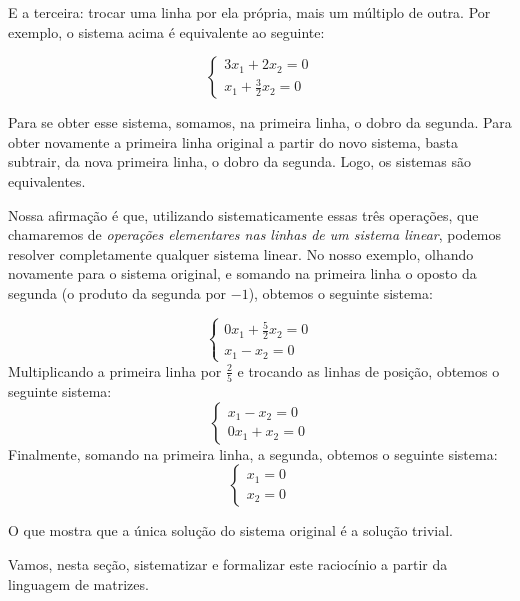 E a terceira: trocar uma linha por ela própria, mais um múltiplo de outra.
Por exemplo, o sistema acima é equivalente ao seguinte:

\begin{equation*}
    \begin{cases}
        3x_1 + 2x_2 = 0 \\
        x_1 + \frac{3}{2}x_2 = 0
    \end{cases}
\end{equation*}

Para se obter esse sistema, somamos, na primeira linha, o dobro da segunda.
Para obter novamente a primeira linha original a partir do novo sistema, basta subtrair, da nova primeira linha, o dobro da segunda.
Logo, os sistemas são equivalentes.

Nossa afirmação é que, utilizando sistematicamente essas três operações, que chamaremos de \emph{operações elementares nas linhas de um sistema linear}, podemos resolver completamente qualquer sistema linear.
No nosso exemplo, olhando novamente para o sistema original, e somando na primeira linha o oposto da segunda (o produto da segunda por $-1$), obtemos o seguinte sistema:

\begin{equation*}
    \begin{cases}
        0x_1 + \frac{5}{2}x_2 = 0 \\
        x_1 - x_2 = 0
    \end{cases}
\end{equation*}
Multiplicando a primeira linha por $\frac{2}{5}$ e trocando as linhas de posição, obtemos o seguinte sistema:
\begin{equation*}
    \begin{cases}
        x_1 - x_2 = 0 \\
        0x_1 + x_2 = 0
    \end{cases}
\end{equation*}
Finalmente, somando na primeira linha, a segunda, obtemos o seguinte sistema:
\begin{equation*}
    \begin{cases}
        x_1 = 0 \\
        x_2 = 0
    \end{cases}
\end{equation*}

O que mostra que a única solução do sistema original é a solução trivial.

Vamos, nesta seção, sistematizar e formalizar este raciocínio a partir da linguagem de matrizes.

